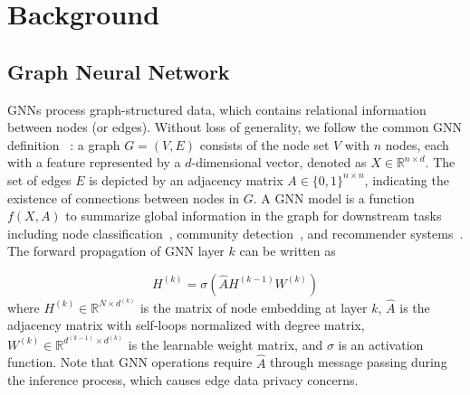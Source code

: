 \section{Background} \label{sec: background}
\subsection{Graph Neural Network} \label{bg: gnn}
GNNs process graph-structured data, which contains relational information between nodes (or edges).
Without loss of generality, we follow the common GNN definition ~\cite{xu2018powerful}:
a graph $G=(V, E)$ consists of the node set $V$ with $n$ nodes, each with a feature represented by a $d$-dimensional vector, denoted as $X\in \mathbb{R}^{n\times d}$.
The set of edges $E$ is depicted by an adjacency matrix $A\in \{0, 1\}^{n\times n}$, indicating the existence of connections between nodes in $G$.
A GNN model is a function $f(X, A)$ to summarize global information in the graph for downstream tasks including node classification~\cite{zhou2019meta}, community detection~\cite{shchur2019overlapping}, and recommender systems~\cite{wu2019session}.
The forward propagation of GNN layer $k$ can be written as 

{\footnotesize
\begin{equation}
    H^{(k)} = \sigma(\hat{A}H^{(k-1)}W^{(k)})
\end{equation}}where $H^{(k)}\in \mathbb{R}^{N\times d^{(k)}}$ is the matrix of node embedding at layer $k$, $\hat{A}$ is the adjacency matrix with self-loops normalized with degree matrix, $W^{(k)}\in \mathbb{R}^{d^{(k-1)}\times d^{(k)}}$ is the learnable weight matrix, and $\sigma$ is an activation function. 
Note that GNN operations require $\hat{A}$ through message passing during the inference process, which causes edge data privacy concerns. 

